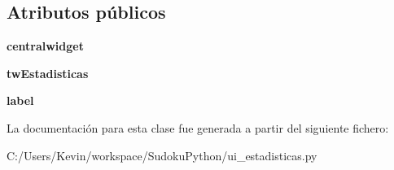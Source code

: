\subsection*{Atributos públicos}
\begin{DoxyCompactItemize}
\item 
{\bfseries centralwidget}\label{classui__estadisticas_1_1_ui__estadisticas_ac1d3ddb2163c81d866cdec2715b68b1b}

\item 
{\bfseries tw\-Estadisticas}\label{classui__estadisticas_1_1_ui__estadisticas_abc888747945522bfa718932280aa10de}

\item 
{\bfseries label}\label{classui__estadisticas_1_1_ui__estadisticas_a1288c4c90023db6dff0b46cc6605c4a4}

\end{DoxyCompactItemize}


La documentación para esta clase fue generada a partir del siguiente fichero\-:\begin{DoxyCompactItemize}
\item 
C\-:/\-Users/\-Kevin/workspace/\-Sudoku\-Python/ui\-\_\-estadisticas.\-py\end{DoxyCompactItemize}
